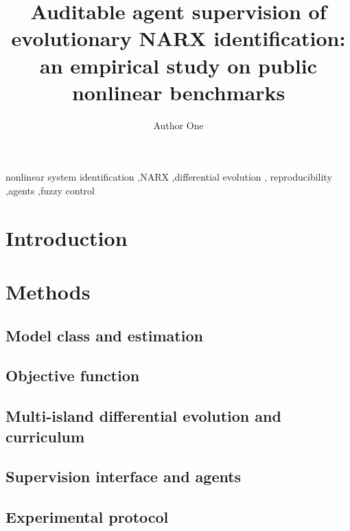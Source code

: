 \documentclass[preprint,12pt]{elsarticle}
\begin{document}
\begin{frontmatter}

\title{Auditable agent supervision of evolutionary NARX identification:
an empirical study on public nonlinear benchmarks}

\author[a]{Author One}

\begin{abstract}
\end{abstract}

\begin{keyword}
nonlinear system identification \sep NARX \sep differential evolution \sep
reproducibility \sep agents \sep fuzzy control
\end{keyword}

\end{frontmatter}

\section{Introduction}
\label{sec:intro}

\section{Methods}
\label{sec:methods}
\subsection{Model class and estimation}
\subsection{Objective function}
\subsection{Multi-island differential evolution and curriculum}
\subsection{Supervision interface and agents}
\subsection{Experimental protocol}
\end{document}
